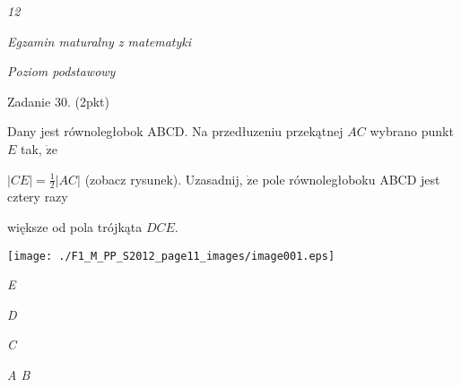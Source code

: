 \documentclass[a4paper,12pt]{article}
\begin{document}
{\it 12}

{\it Egzamin maturalny z matematyki}

{\it Poziom podstawowy}

Zadanie 30. (2pkt)

Dany jest równoległobok ABCD. Na przedłuzeniu przekątnej $AC$ wybrano punkt $E$ tak, $\dot{\mathrm{z}}\mathrm{e}$

$|CE|=\displaystyle \frac{1}{2}|AC|$ (zobacz rysunek). Uzasadnij, $\dot{\mathrm{z}}\mathrm{e}$ pole równoległoboku ABCD jest cztery razy

większe od pola trójkąta $DCE.$
\begin{center}
\texttt{[image: ./F1\_M\_PP\_S2012\_page11\_images/image001.eps]}
\end{center}
{\it E}

{\it D}

{\it C}

{\it A  B}
\end{document}
